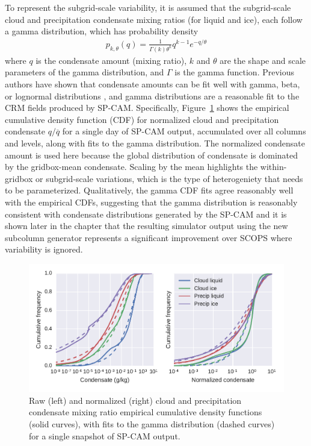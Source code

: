 To represent the subgrid-scale variability, it is assumed that the
subgrid-scale cloud and precipitation condensate mixing ratios (for
liquid and ice), each follow a gamma distribution, which has probability
density \[\begin{gathered} 
    p_{k, \theta}(q) 
        = \frac{1}{\Gamma(k) \theta^k} q^{k - 1} e^{-q/\theta}
\end{gathered}\] where \(q\) is the condensate amount (mixing ratio),
\(k\) and \(\theta\) are the shape and scale parameters of the gamma
distribution, and \(\Gamma\) is the gamma function. Previous authors
have shown that condensate amounts can be fit well with gamma, beta, or
lognormal distributions \citep[e.g.;][]{lee_et_al_2010}, and gamma
distributions are a reasonable fit to the CRM fields produced by SP-CAM.
Specifically, Figure~\ref{fig:mxratioCDF} shows the empirical cumulative
density function (CDF) for normalized cloud and precipitation condensate
\(q / \overline{q}\) for a single day of SP-CAM output, accumulated over
all columns and levels, along with fits to the gamma distribution. The
normalized condensate amount is used here because the global
distribution of condensate is dominated by the gridbox-mean condensate.
Scaling by the mean highlights the within-gridbox or subgrid-scale
variations, which is the type of heterogeniety that needs to be
parameterized. Qualitatively, the gamma CDF fits agree reasonably well
with the empirical CDFs, suggesting that the gamma distribution is
reasonably consistent with condensate distributions generated by the
SP-CAM and it is shown later in the chapter that the resulting simulator
output using the new subcolumn generator represents a significant
improvement over SCOPS where variability is ignored.

\begin{figure}[htbp]
\centering
\includegraphics{graphics/subgrid2_mxratio_cdf1.pdf}
\caption{\label{fig:mxratioCDF}Raw (left) and normalized (right) cloud
and precipitation condensate mixing ratio empirical cumulative density
functions (solid curves), with fits to the gamma distribution (dashed
curves) for a single snapshot of SP-CAM output.}\label{fig:mxratioCDF}
\end{figure}

